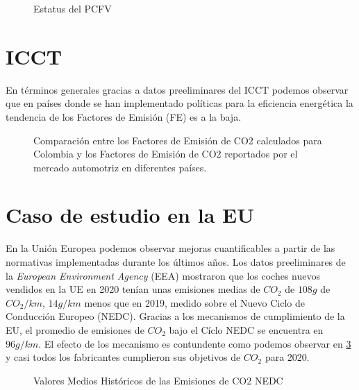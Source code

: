 \begin{figure}[htbp]
   \centering
   
    \caption{Estatus del PCFV \cite{Vehicles_PCFV}}
    \label{fig:statuslatam-PCFV}
\end{figure}

\section{ICCT}

En términos generales gracias a datos preeliminares del ICCT podemos observar que en países donde se han implementado políticas para la eficiencia energética la tendencia de los Factores de Emisión (FE) es a la baja.

\begin{figure}[htbp]
   \centering
   
    \caption{Comparación entre los Factores de Emisión de CO2 calculados para Colombia y los Factores de Emisión de CO2 reportados por el mercado automotriz en diferentes países. \cite{ICCT_Performance_2020}}
    \label{fig:linebaseclase}
\end{figure}

\section{Caso de estudio en la EU}

En la Unión Europea podemos observar mejoras cuantificables a partir de las normativas implementadas durante los últimos años. Los datos preeliminares de la \textit{European Environment Agency} (EEA) mostraron que los coches nuevos vendidos en la UE en 2020 tenían unas emisiones medias de $CO_2$ de $108g$ de $CO_2/km$, $14g/km$ menos que en 2019, medido sobre el Nuevo Ciclo de Conducción Europeo (NEDC). \cite{ICCT_Performance_2020} Gracias a los mecanismos de cumplimiento de la EU, el promedio de emisiones de $CO_2$ bajo el Cíclo NEDC se encuentra en $96 g/km$. El efecto de los mecanismo es contundente como podemos observar en \ref{fig:iccp-performance} y casi todos los fabricantes cumplieron sus objetivos de $CO_2$ para 2020.

 \begin{figure}[htbp]
   \centering
   
    \caption{Valores Medios Históricos de las Emisiones de CO2 NEDC \cite{ICCT_Performance_2020}}
    \label{fig:iccp-performance}
\end{figure}